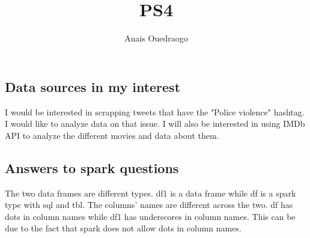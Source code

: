\documentclass{article}
\title{PS4}
\author{Anais Ouedraogo}
\begin{document}
\maketitle





\subsection{Data sources in my interest}

I would be interested in scrapping tweets that have the "Police violence" hashtag. I would like to analyze data on that issue. I will also be interested in using IMDb API to analyze the different movies and data about them.



\subsection{Answers to spark questions}

The two data frames are different types. df1 is a data frame while df is a spark type with sql and tbl.
The columns' names are different across the two. df has dots in column names while df1 has underscores in column names. This can be due to the fact that spark does not allow dots in column names.
\end{document}
